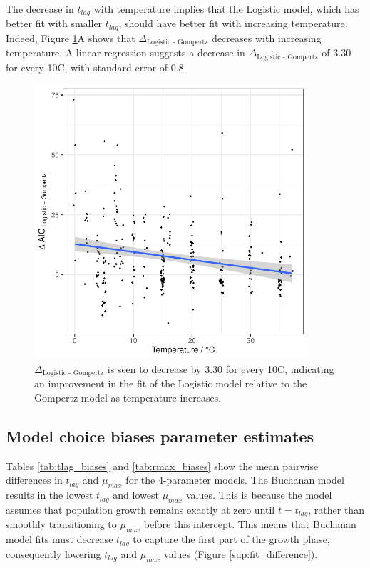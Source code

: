 \documentclass[11pt, a4paper]{article}
\begin{document}
\begin{linenumbers}
The decrease in $t_{lag}$ with temperature implies that the Logistic model, which has better fit with smaller $t_{lag}$, should have better fit with increasing temperature. Indeed, Figure \ref{fig:logistic_temp}A shows that $\Delta_{\text{Logistic - Gompertz}}$  decreases with increasing temperature. A linear regression suggests a decrease in $\Delta_{\text{Logistic - Gompertz}}$ of 3.30 for every 10\degree C, with standard error of 0.8.

                \begin{figure}[H]
                \centering
        \includegraphics[width=4in]{../results/logistic_vs_gompertz_temp.pdf}
        \caption{$\Delta_{\text{Logistic - Gompertz}}$ is seen to decrease by 3.30 for every 10\degree C, indicating an improvement in the fit of the Logistic model relative to the Gompertz model as temperature increases.}
        \label{fig:logistic_temp}
        \end{figure}  

\subsection{Model choice biases parameter estimates}

Tables \ref{tab:tlag_biases} and \ref{tab:rmax_biases} show the mean pairwise differences in $t_{lag}$ and $\mu_{max}$ for the 4-parameter models. The Buchanan model results in the lowest $t_{lag}$ and lowest $\mu_{max}$ values. This is because the model assumes that population growth remains exactly at zero until $t = t_{lag}$, rather than smoothly transitioning to $\mu_{max}$ before this intercept. This means that Buchanan model fits must decrease $t_{lag}$ to capture the first part of the growth phase, consequently lowering $t_{lag}$ and $\mu_{max}$ values (Figure \ref{sup:fit_difference}).


\end{linenumbers}
\end{document}
